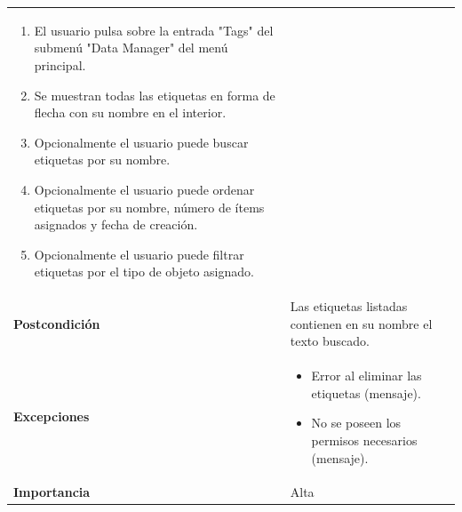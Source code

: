 \documentclass[
]{article}
\providecommand{\tightlist}{%
  \setlength{\itemsep}{0pt}\setlength{\parskip}{0pt}}
\begin{document}
\begin{longtable}[]{@{}ll@{}}
\begin{minipage}[t]{0.77\columnwidth}
\begin{enumerate}
\def\labelenumi{\arabic{enumi}.}
\tightlist
\item
  El usuario pulsa sobre la entrada "Tags" del submenú "Data Manager"
  del menú principal.
\item
  Se muestran todas las etiquetas en forma de flecha con su nombre en el
  interior.
\item
  Opcionalmente el usuario puede buscar etiquetas por su nombre.
\item
  Opcionalmente el usuario puede ordenar etiquetas por su nombre, número
  de ítems asignados y fecha de creación.
\item
  Opcionalmente el usuario puede filtrar etiquetas por el tipo de objeto
  asignado.
\end{enumerate}\strut
\end{minipage}\tabularnewline
\begin{minipage}[t]{0.17\columnwidth}\raggedright
\textbf{Postcondición}\strut
\end{minipage} & \begin{minipage}[t]{0.77\columnwidth}\raggedright
Las etiquetas listadas contienen en su nombre el texto buscado.\strut
\end{minipage}\tabularnewline
\begin{minipage}[t]{0.17\columnwidth}\raggedright
\textbf{Excepciones}\strut
\end{minipage} & \begin{minipage}[t]{0.77\columnwidth}\raggedright
\begin{itemize}
\tightlist
\item
  Error al eliminar las etiquetas (mensaje).
\item
  No se poseen los permisos necesarios (mensaje).
\end{itemize}\strut
\end{minipage}\tabularnewline
\begin{minipage}[t]{0.17\columnwidth}\raggedright
\textbf{Importancia}\strut
\end{minipage} & \begin{minipage}[t]{0.77\columnwidth}\raggedright
Alta\strut
\end{minipage}\tabularnewline
\bottomrule
\end{longtable}
\end{document}
